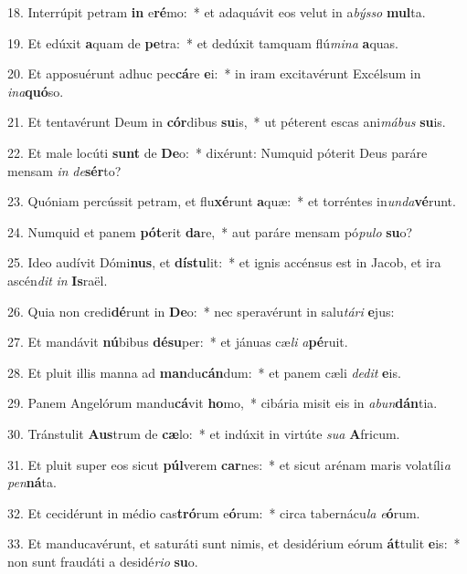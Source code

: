 18. Interrúpit petram \textbf{in} e\textbf{ré}mo:~*  et adaquávit eos velut in a\textit{býs}\textit{so} \textbf{mul}ta.\

19. Et edúxit \textbf{a}quam de \textbf{pe}tra:~*  et dedúxit tamquam flú\textit{mi}\textit{na} \textbf{a}quas.\

20. Et apposuérunt adhuc pec\textbf{cá}re \textbf{e}i:~*  in iram excitavérunt Excélsum in \textit{in}\textit{a}\textbf{quó}so.\

21. Et tentavérunt Deum in \textbf{cór}dibus \textbf{su}is,~*  ut péterent escas ani\textit{má}\textit{bus} \textbf{su}is.\

22. Et male locúti \textbf{sunt} de \textbf{De}o:~*  dixérunt: Numquid póterit Deus paráre mensam \textit{in} \textit{de}\textbf{sér}to?\

23. Quóniam percússit petram, et flu\textbf{xé}runt \textbf{a}quæ:~*  et torréntes in\textit{un}\textit{da}\textbf{vé}runt.\

24. Numquid et panem \textbf{pót}erit \textbf{da}re,~*  aut paráre mensam pó\textit{pu}\textit{lo} \textbf{su}o?\

25. Ideo audívit Dómi\textbf{nus}, et \textbf{dís}\textbf{tu}lit:~*  et ignis accénsus est in Jacob, et ira ascén\textit{dit} \textit{in} \textbf{Is}raël.\

26. Quia non credi\textbf{dé}runt in \textbf{De}o:~*  nec speravérunt in salu\textit{tá}\textit{ri} \textbf{e}jus:\

27. Et mandávit \textbf{nú}bibus \textbf{dé}\textbf{su}per:~*  et jánuas cæ\textit{li} \textit{a}\textbf{pé}ruit.\

28. Et pluit illis manna ad \textbf{man}du\textbf{cán}dum:~*  et panem cæli \textit{de}\textit{dit} \textbf{e}is.\

29. Panem Angelórum mandu\textbf{cá}vit \textbf{ho}mo,~*  cibária misit eis in \textit{ab}\textit{un}\textbf{dán}tia.\

30. Tránstulit \textbf{Aus}trum de \textbf{cæ}lo:~*  et indúxit in virtúte \textit{su}\textit{a} \textbf{A}fricum.\

31. Et pluit super eos sicut \textbf{púl}verem \textbf{car}nes:~*  et sicut arénam maris volatíli\textit{a} \textit{pen}\textbf{ná}ta.\

32. Et cecidérunt in médio cas\textbf{tró}rum e\textbf{ó}rum:~*  circa tabernácu\textit{la} \textit{e}\textbf{ó}rum.\

33. Et manducavérunt, et saturáti sunt nimis, et desidérium eórum \textbf{át}tulit \textbf{e}is:~*  non sunt fraudáti a desidé\textit{ri}\textit{o} \textbf{su}o.\

